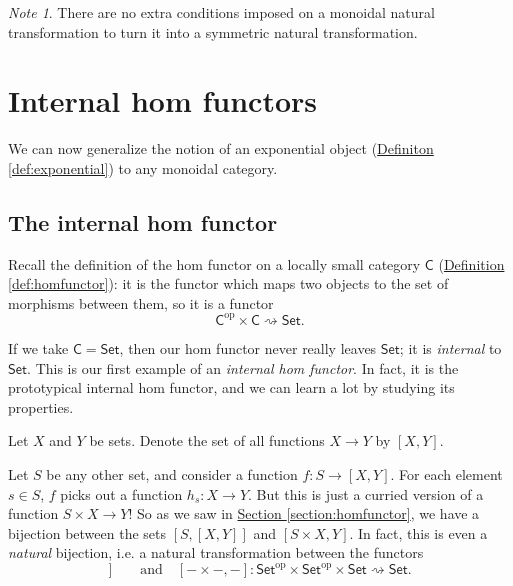 \documentclass[a4paper]{report}
\theoremstyle{definition}
\theoremstyle{plain}
\theoremstyle{remark}
\newtheorem{note}{Note}[section]
\begin{document}
\begin{note}
  There are no extra conditions imposed on a monoidal natural transformation to turn it into a symmetric natural transformation. 
\end{note}
\section{Internal hom functors} \label{sec:internalhomfunctors}
We can now generalize the notion of an exponential object (\hyperref[def:exponential]{Definiton \ref*{def:exponential}}) to any monoidal category.
\subsection{The internal hom functor}
Recall the definition of the hom functor on a locally small category $\mathsf{C}$ (\hyperref[def:homfunctor]{Definition \ref*{def:homfunctor}}): it is the functor which maps two objects to the set of morphisms between them, so it is a functor
\begin{equation*}
  \mathsf{C}^{\mathrm{op}} \times \mathsf{C} \rightsquigarrow \mathsf{Set}.
\end{equation*}

If we take $\mathsf{C} = \mathsf{Set}$, then our hom functor never really leaves $\mathsf{Set}$; it is \emph{internal} to $\mathsf{Set}$. This is our first example of an \emph{internal hom functor}. In fact, it is the prototypical internal hom functor, and we can learn a lot by studying its properties. 

Let $X$ and $Y$ be sets. Denote the set of all functions $X \to Y$ by $[X,Y]$. 

Let $S$ be any other set, and consider a function $f\colon S \to [X, Y]$. For each element $s \in S$, $f$ picks out a function $h_{s}\colon X \to Y$. But this is just a curried version of a function $S \times X \to Y$! So as we saw in \hyperref[section:homfunctor]{Section \ref*{section:homfunctor}}, we have a bijection between the sets $[S, [X, Y]]$ and $[S \times X, Y]$. In fact, this is even a \emph{natural} bijection, i.e. a natural transformation between the functors 
\begin{equation*}
  [-,[-,-]]\qquad \text{and}\quad [- \times -, -]\colon \mathsf{Set}^{\mathrm{op}} \times \mathsf{Set}^{\mathrm{op}} \times \mathsf{Set} \rightsquigarrow \mathsf{Set}.
\end{equation*}
\end{document}

